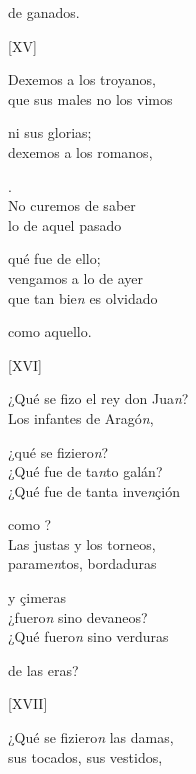 \documentclass[11pt,a4paper,twoside]{article}
\begin{document}
{de ganados.
\pend

\begin{center}
	[XV]
\end{center}
\pstart
Dexemos a los troyanos,\\
que sus males no los vimos

ni sus glorias;\\
dexemos a los romanos,\\

.\\
No curemos de saber\\
lo de aquel  pasado

qué fue de ello;\\
vengamos a lo de ayer\\
que tan bie\textit{n} es olvidado

como aquello.
\pend

\begin{center}
	[XVI]
\end{center}
\pstart
¿Qué se fizo el rey don Jua\textit{n}?\\
Los infantes de Aragó\textit{n},

¿qué se fiziero\textit{n}?\\
¿Qué fue de ta\textit{n}to galán?\\
¿Qué fue de tanta inve\textit{n}çión

como ?\\
Las justas y los torneos,\\
parame\textit{n}tos, bordaduras

y çimeras\\
¿fuero\textit{n} sino devaneos?\\
¿Qué fuero\textit{n} sino verduras

de las eras? 
\pend

\begin{center}
	[XVII]
\end{center}
\pstart
¿Qué se fiziero\textit{n} las damas,\\
sus tocados, sus vestidos,

}
\end{document}
